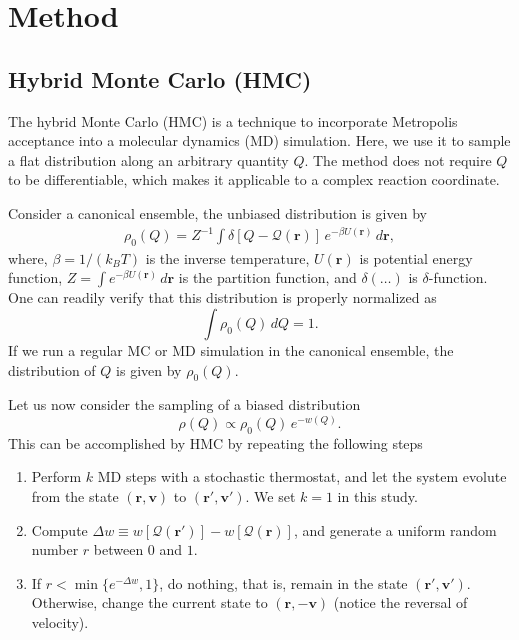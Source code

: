 \documentclass{article}
\newcommand{\vct}[1]{\mathbf{#1}}
\newcommand{\vr}{\vct{r}}
\newcommand{\vv}{\vct{v}}
\newcommand{\Q}{\mathcal{Q}}
\begin{document}
\section{Method}

\subsection{Hybrid Monte Carlo (HMC)}



The hybrid Monte Carlo (HMC)
is a technique to incorporate Metropolis acceptance
into a molecular dynamics (MD) simulation.
%
Here, we use it to sample a flat distribution
along an arbitrary quantity $Q$.
%
The method
does not require $Q$ to be differentiable,
which makes it applicable to
a complex reaction coordinate.

Consider a canonical ensemble,
the unbiased distribution
is given by
\begin{align}
  \rho_0(Q)
=
  Z^{-1} \int \delta[Q - \Q(\vr)] \, e^{-\beta U(\vr)} \, d\vr,
\end{align}
where,
$\beta = 1/(k_B T)$ is the inverse temperature,
$U(\vr)$ is potential energy function,
$Z = \int e^{-\beta U(\vr)} \, d\vr$ is the partition function,
and $\delta(\dots)$ is $\delta$-function.
%
One can readily verify that this distribution is properly normalized as
\[
  \int \rho_0(Q) \, dQ = 1.
\]
%
If we run a regular MC or MD simulation in the canonical ensemble,
the distribution of $Q$ is given by $\rho_0(Q)$.

Let us now consider the sampling of a biased distribution
\begin{equation}
  \rho(Q) \propto \rho_0(Q) \, e^{-w(Q)}.
\label{eq:rhoQbiased}
\end{equation}
This can be accomplished by HMC by repeating the following steps
\begin{enumerate}
  \item Perform $k$ MD steps with a stochastic thermostat,
        and let the system evolute
        from the state $(\vr, \vv)$ to $(\vr', \vv')$.
        We set $k = 1$ in this study.

  \item Compute $\Delta w \equiv w[\Q(\vr')] - w[\Q(\vr)]$,
        and generate a uniform random number $r$ between $0$ and $1$.

  \item If $r < \min\{e^{-\Delta w}, 1\}$, do nothing,
        that is, remain in the state $(\vr', \vv')$.
        Otherwise, change the current state to $(\vr, -\vv)$
        (notice the reversal of velocity).
\end{enumerate}
\end{document}
